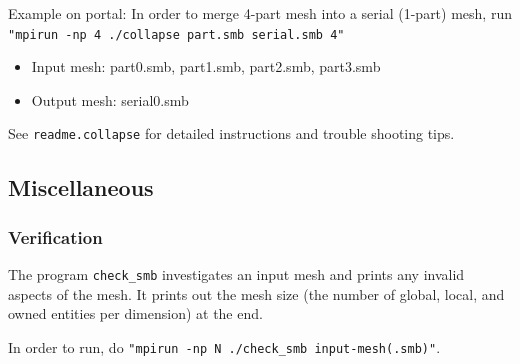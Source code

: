 Example on portal:
\newline
In order to merge 4-part mesh into a serial (1-part) mesh, run
\texttt{"mpirun -np 4 ./collapse part.smb serial.smb 4"}
\begin{itemize}
\item	Input mesh: part0.smb, part1.smb, part2.smb, part3.smb
\item	Output mesh: serial0.smb
\end{itemize}

See \texttt{readme.collapse} for detailed instructions and trouble shooting tips.

\subsection{Miscellaneous}
\label{ch:mesh-misc}

\subsubsection{Verification}

The program \texttt{check\_smb} investigates an input mesh and prints any invalid aspects of the mesh. It prints out the mesh size (the number of global, local, and owned entities per dimension) at the end. 

In order to run, do \texttt{"mpirun -np N ./check\_smb input-mesh(.smb)"}.
